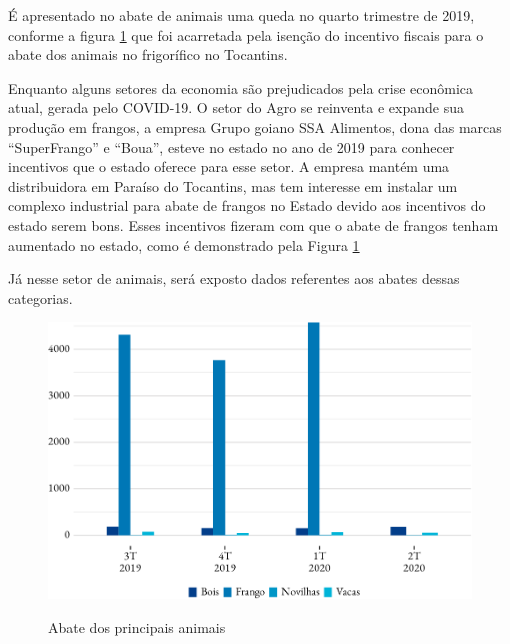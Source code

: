 \par É apresentado no abate de animais uma queda no quarto trimestre de 2019, conforme a figura \ref{fig:abate} que foi acarretada pela isenção do incentivo fiscais para o abate dos animais no frigorífico no Tocantins.

\par Enquanto alguns setores da economia são prejudicados pela crise econômica atual, gerada pelo COVID-19. O setor do Agro se reinventa e expande sua produção em frangos, a empresa Grupo goiano SSA Alimentos, dona das marcas “SuperFrango” e “Boua”, esteve no estado no ano de 2019 para conhecer incentivos que o estado oferece para esse setor. A empresa mantém uma distribuidora em Paraíso do Tocantins, mas tem interesse em instalar um complexo industrial para abate de frangos no Estado devido aos incentivos do estado serem bons. Esses incentivos fizeram com que o abate de frangos tenham aumentado no estado, como é demonstrado pela Figura \ref{fig:abate}


\par Já nesse setor de animais, será exposto dados referentes aos abates dessas categorias.

\begin{figure}[!h]
	\caption{Abate dos principais animais}
	\includegraphics{fig/abates-1.pdf}
	\label{fig:abate}
\end{figure}
